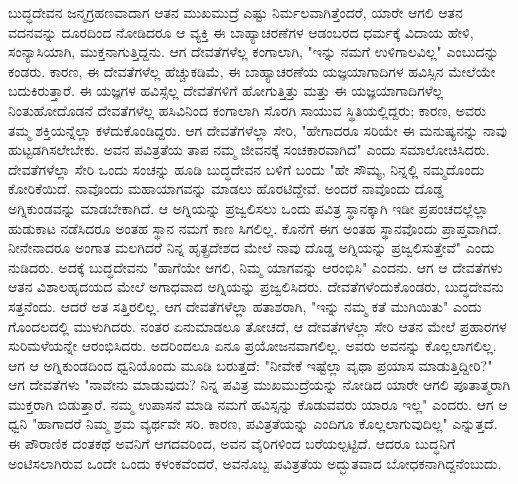 ಬುದ್ಧದೇವನ ಜನ್ಮಗ್ರಹಣವಾದಾಗ ಆತನ ಮುಖಮುದ್ರೆ ಎಷ್ಟು ನಿರ್ಮಲವಾಗಿತ್ತೆಂದರೆ, ಯಾರೇ ಆಗಲಿ ಆತನ ವದನವನ್ನು ದೂರದಿಂದ ನೋಡಿದರೂ ಆ ವ್ಯಕ್ತಿ ಈ ಬಾಹ್ಯಾಚರಣೆಗಳ ಆಡಂಬರದ ಧರ್ಮಕ್ಕೆ ವಿದಾಯ ಹೇಳಿ, ಸಂನ್ಯಾಸಿಯಾಗಿ, ಮುಕ್ತನಾಗುತ್ತಿದ್ದನು. ಆಗ ದೇವತೆಗಳೆಲ್ಲ ಕಂಗಾಲಾಗಿ, "ಇನ್ನು ನಮಗೆ ಉಳಿಗಾಲವಿಲ್ಲ" ಎಂಬುದನ್ನು ಕಂಡರು. ಕಾರಣ, ಈ ದೇವತೆಗಳೆಲ್ಲ ಹೆಚ್ಚುಕಡಿಮೆ, ಈ ಬಾಹ್ಯಾಚರಣೆಯ ಯಜ್ಞಯಾಗಾದಿಗಳ ಹವಿಸ್ಸಿನ ಮೇಲೆಯೇ ಬದುಕಿರುತ್ತಾರೆ. ಈ ಯಜ್ಞಗಳ ಹವಿಸ್ಸೆಲ್ಲ ದೇವತೆಗಳಿಗೆ ಹೋಗುತ್ತಿತ್ತು ಮತ್ತು ಈ ಯಜ್ಞಯಾಗಾದಿಗಳೆಲ್ಲ ನಿಂತುಹೋದೊಡನೆ ದೇವತೆಗಳೆಲ್ಲ ಹಸಿವಿನಿಂದ ಕಂಗಾಲಾಗಿ ಸೊರಗಿ ಸಾಯುವ ಸ್ಥಿತಿಯಲ್ಲಿದ್ದರು; ಕಾರಣ, ಅವರು ತಮ್ಮ ಶಕ್ತಿಯನ್ನೆಲ್ಲಾ ಕಳೆದುಕೊಂಡಿದ್ದರು. ಆಗ ದೇವತೆಗಳೆಲ್ಲಾ ಸೇರಿ, "ಹೇಗಾದರೂ ಸರಿಯೇ ಈ ಮನುಷ್ಯನನ್ನು ನಾವು ಹುಟ್ಟಡಗಿಸಲೇಬೇಕು. ಅವನ ಪವಿತ್ರತೆಯ ತಾಪ ನಮ್ಮ ಜೀವನಕ್ಕೆ ಸಂಚಕಾರವಾಗಿದೆ" ಎಂದು ಸಮಾಲೋಚಿಸಿದರು. ದೇವತೆಗಳೆಲ್ಲಾ ಸೇರಿ ಒಂದು ಸಂಚನ್ನು ಹೂಡಿ ಬುದ್ಧದೇವನ ಬಳಿಗೆ ಬಂದು "ಹೇ ಸೌಮ್ಯ, ನಿನ್ನಲ್ಲಿ ನಮ್ಮದೊಂದು ಕೋರಿಕೆಯಿದೆ. ನಾವೊಂದು ಮಹಾಯಾಗವನ್ನು ಮಾಡಲು ಹೊರಟಿದ್ದೇವೆ. ಅಂದರೆ ನಾವೊಂದು ದೊಡ್ಡ ಅಗ್ನಿಕುಂಡವನ್ನು ಮಾಡಬೇಕಾಗಿದೆ. ಆ ಅಗ್ನಿಯನ್ನು ಪ್ರಜ್ವಲಿಸಲು ಒಂದು ಪವಿತ್ರ ಸ್ಥಾನಕ್ಕಾಗಿ ಇಡೀ ಪ್ರಪಂಚದಲ್ಲೆಲ್ಲಾ ಹುಡುಕಾಟ ನಡೆಸಿದರೂ ಅಂತಹ ಸ್ಥಾನ ನಮಗೆ ಕಾಣ ಸಿಗಲಿಲ್ಲ. ಕೊನೆಗೆ ಈಗ ಅಂತಹ ಸ್ಥಾನವೊಂದು ಪ್ರಾಪ್ತವಾಗಿದೆ. ನೀನೇನಾದರೂ ಅಂಗಾತ ಮಲಗಿದರೆ ನಿನ್ನ ಹೃತ್ಪ್ರದೇಶದ ಮೇಲೆ ನಾವು ದೊಡ್ಡ ಅಗ್ನಿಯನ್ನು ಪ್ರಜ್ವಲಿಸುತ್ತೇವೆ" ಎಂದು ನುಡಿದರು. ಅದಕ್ಕೆ ಬುದ್ಧದೇವನು "ಹಾಗೆಯೇ ಆಗಲಿ, ನಿಮ್ಮ ಯಾಗವನ್ನು ಆರಂಭಿಸಿ" ಎಂದನು. ಆಗ ಆ ದೇವತೆಗಳು ಆತನ ವಿಶಾಲಹೃದಯದ ಮೇಲೆ ಅಗಾಧವಾದ ಅಗ್ನಿಯನ್ನು ಪ್ರಜ್ವಲಿಸಿದರು. ದೇವತೆಗಳೆಂದುಕೊಂಡರು, ಬುದ್ಧದೇವನು ಸತ್ತನೆಂದು. ಆದರೆ ಅತ ಸತ್ತಿರಲಿಲ್ಲ. ಆಗ ದೇವತೆಗಳೆಲ್ಲಾ ಹತಾಶರಾಗಿ, "ಇನ್ನು ನಮ್ಮ ಕತೆ ಮುಗಿಯಿತು" ಎಂದು ಗೊಂದಲದಲ್ಲಿ ಮುಳುಗಿದರು. ನಂತರ ಏನುಮಾಡಲೂ ತೋಚದೆ, ಆ ದೇವತೆಗಳೆಲ್ಲಾ ಸೇರಿ ಆತನ ಮೇಲೆ ಪ್ರಹಾರಗಳ ಸುರಿಮಳೆಯನ್ನೇ ಆರಂಭಿಸಿದರು. ಅದರಿಂದಲೂ ಏನೂ ಪ್ರಯೋಜನವಾಗಲಿಲ್ಲ. ಅವರು ಅವನನ್ನು ಕೊಲ್ಲಲಾಗಲಿಲ್ಲ. ಆಗ ಆ ಅಗ್ನಿಕುಂಡದಿಂದ ಧ್ವನಿಯೊಂದು ಮೂಡಿ ಬರುತ್ತದೆ: "ನೀವೇಕೆ ಇಷ್ಟೆಲ್ಲಾ ವೃಥಾ ಪ್ರಯಾಸ ಮಾಡುತ್ತಿದ್ದೀರಿ?" ಆಗ ದೇವತೆಗಳು "ನಾವೇನು ಮಾಡುವುದು? ನಿನ್ನ ಪವಿತ್ರ ಮುಖಮುದ್ರೆಯನ್ನು ನೋಡಿದ ಯಾರೇ ಆಗಲಿ ಪೂತಾತ್ಮರಾಗಿ ಮುಕ್ತರಾಗಿ ಬಿಡುತ್ತಾರೆ. ನಮ್ಮ ಉಪಾಸನೆ ಮಾಡಿ ನಮಗೆ ಹವಿಸ್ಸನ್ನು ಕೊಡುವವರು ಯಾರೂ ಇಲ್ಲ" ಎಂದರು. ಆಗ ಆ ಧ್ವನಿ "ಹಾಗಾದರೆ ನಿಮ್ಮ ಶ್ರಮ ವ್ಯರ್ಥವೇ ಸರಿ. ಕಾರಣ, ಪವಿತ್ರತೆಯನ್ನು ಎಂದಿಗೂ ಕೊಲ್ಲಲಾಗುವುದಿಲ್ಲ" ಎನ್ನುತ್ತದೆ. ಈ ಪೌರಾಣಿಕ ದಂತಕಥೆ ಅವನಿಗೆ ಆಗದವರಿಂದ, ಅವನ ವೈರಿಗಳಿಂದ ಬರೆಯಲ್ಪಟ್ಟಿದೆ. ಆದರೂ ಬುದ್ಧನಿಗೆ ಅಂಟಿಸಲಾಗಿರುವ ಒಂದೇ ಒಂದು ಕಳಂಕವೆಂದರೆ, ಅವನೊಬ್ಬ ಪವಿತ್ರತೆಯ ಅದ್ಭುತವಾದ ಬೋಧಕನಾಗಿದ್ದನೆಂಬುದು.

